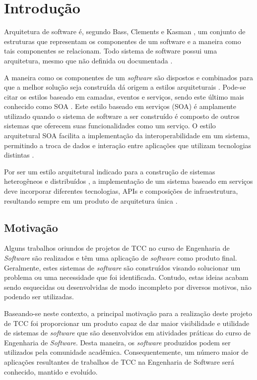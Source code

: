 \chapter[Introdução]{Introdução}
Arquitetura de software é, segundo Bass, Clements e Kasman \cite{bass_software_archi_practice_2003}, um conjunto de estruturas que representam os componentes de um software e a maneira como tais componentes se relacionam. Todo sistema de software possui uma arquitetura, mesmo que não definida ou documentada \cite{bass_software_archi_practice_2003}.

A maneira como os componentes de um \textit{software} são dispostos e combinados para que a melhor solução seja construída dá origem a estilos arquiteturais \cite{pressman2006engenharia}. Pode-se citar os estilos baseado em camadas, eventos e serviços, sendo este último mais conhecido como SOA \cite{josuttis_soa_2007}. Este estilo baseado em serviços (SOA) é amplamente utilizado quando o sistema de software a ser construído é composto de outros sistemas que oferecem suas funcionalidades como um serviço. O estilo arquitetural SOA facilita a implementação da interoperabilidade em um sistema, permitindo a troca de dados e interação entre aplicações que utilizam tecnologias distintas \cite{oqueesoa_2010}.

Por ser um estilo arquitetural indicado para a construção de sistemas heterogêneos e distribuídos \cite{josuttis_soa_2007}, a implementação de um sistema baseado em serviços deve incorporar diferentes tecnologias, APIs e composições de infraestrutura, resultando sempre em um produto de arquitetura única \cite{erl_orientacaoaservico_2009}.

\section{Motivação}
Alguns trabalhos oriundos de projetos de TCC no curso de Engenharia de \textit{Software} são realizados e têm uma aplicação de \textit{software} como produto final. Geralmente, estes sistemas de \textit{software} são construídos visando solucionar um problema ou uma necessidade que foi identificada. Contudo, estas ideias acabam sendo esquecidas ou desenvolvidas de modo incompleto por diversos motivos, não podendo ser utilizadas.

Baseando-se neste contexto, a principal motivação para a realização deste projeto de TCC foi proporcionar um produto capaz de dar maior visibilidade e utilidade de sistemas de \textit{software} que são desenvolvidos em atividades práticas do curso de Engenharia de \textit{Software}. Desta maneira, os \textit{software} produzidos podem ser utilizados pela comunidade acadêmica. Consequentemente, um número maior de aplicações resultantes de trabalhos de TCC na Engenharia de Software será conhecido, mantido e evoluído. 

